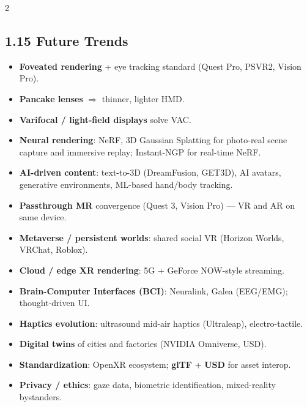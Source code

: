 \begin{paracol}{2}
\subsection*{1.15 Future Trends}
\begin{itemize}[leftmargin=*,nosep]
  \item \textbf{Foveated rendering} + eye tracking standard (Quest Pro, PSVR2, Vision Pro).
  \item \textbf{Pancake lenses} $\Rightarrow$ thinner, lighter HMD.
  \item \textbf{Varifocal / light-field displays} solve VAC.
  \item \textbf{Neural rendering}: NeRF, 3D Gaussian Splatting for photo-real scene capture and immersive replay; Instant-NGP for real-time NeRF.
  \item \textbf{AI-driven content}: text-to-3D (DreamFusion, GET3D), AI avatars, generative environments, ML-based hand/body tracking.
  \item \textbf{Passthrough MR} convergence (Quest 3, Vision Pro) — VR and AR on same device.
  \item \textbf{Metaverse / persistent worlds}: shared social VR (Horizon Worlds, VRChat, Roblox).
  \item \textbf{Cloud / edge XR rendering}: 5G + GeForce NOW-style streaming.
  \item \textbf{Brain-Computer Interfaces (BCI)}: Neuralink, Galea (EEG/EMG); thought-driven UI.
  \item \textbf{Haptics evolution}: ultrasound mid-air haptics (Ultraleap), electro-tactile.
  \item \textbf{Digital twins} of cities and factories (NVIDIA Omniverse, USD).
  \item \textbf{Standardization}: OpenXR ecosystem; \textbf{glTF} + \textbf{USD} for asset interop.
  \item \textbf{Privacy / ethics}: gaze data, biometric identification, mixed-reality bystanders.
\end{itemize}

\switchcolumn


\end{paracol}
